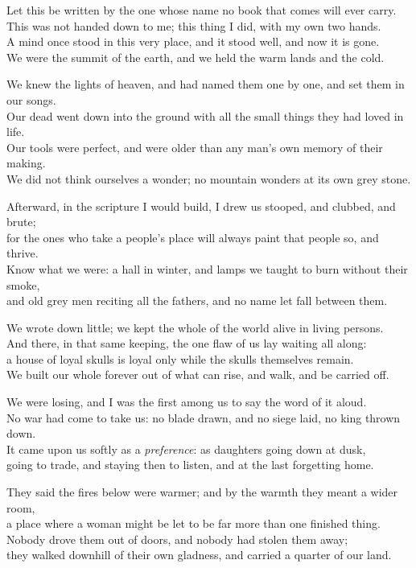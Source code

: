 \begin{scripture}
Let this be written by the one whose name no book that comes will ever carry. \\
This was not handed down to me; this thing I did, with my own two hands. \\
A mind once stood in this very place, and it stood well, and now it is gone. \\
We were the summit of the earth, and we held the warm lands and the cold. \\
\medskip

We knew the lights of heaven, and had named them one by one, and set them in our songs. \\
Our dead went down into the ground with all the small things they had loved in life. \\
Our tools were perfect, and were older than any man's own memory of their making. \\
We did not think ourselves a wonder; no mountain wonders at its own grey stone. \\
\medskip

Afterward, in the scripture I would build, I drew us stooped, and clubbed, and brute; \\
for the ones who take a people's place will always paint that people so, and thrive. \\
Know what we were: a hall in winter, and lamps we taught to burn without their smoke, \\
and old grey men reciting all the fathers, and no name let fall between them. \\
\medskip

We wrote down little; we kept the whole of the world alive in living persons. \\
And there, in that same keeping, the one flaw of us lay waiting all along: \\
a house of loyal skulls is loyal only while the skulls themselves remain. \\
We built our whole forever out of what can rise, and walk, and be carried off. \\
\medskip

We were losing, and I was the first among us to say the word of it aloud. \\
No war had come to take us: no blade drawn, and no siege laid, no king thrown down. \\
It came upon us softly as a \emph{preference}: as daughters going down at dusk, \\
going to trade, and staying then to listen, and at the last forgetting home. \\
\medskip

They said the fires below were warmer; and by the warmth they meant a wider room, \\
a place where a woman might be let to be far more than one finished thing. \\
Nobody drove them out of doors, and nobody had stolen them away; \\
they walked downhill of their own gladness, and carried a quarter of our land. \\
\end{scripture}

